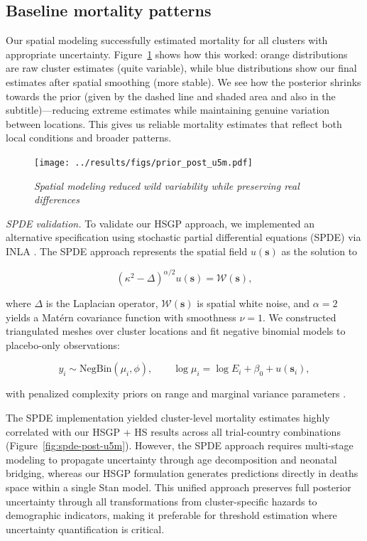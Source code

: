 \documentclass[11pt]{article}\usepackage[]{graphicx}\usepackage[]{xcolor}
\begin{document}
\subsection{Baseline mortality patterns}

Our spatial modeling successfully estimated mortality for all clusters with appropriate uncertainty. Figure~\ref{fig:prior-post-u5m} shows how this worked: orange distributions are raw cluster estimates (quite variable), while blue distributions show our final estimates after spatial smoothing (more stable). We see how the posterior shrinks towards the prior (given by the dashed line and shaded area and also in the subtitle)---reducing extreme estimates while maintaining genuine variation between locations. This gives us reliable mortality estimates that reflect both local conditions and broader patterns. 

\begin{figure}[!h]
\centering
\texttt{[image: ../results/figs/prior\_post\_u5m.pdf]}
\caption{\emph{Spatial modeling reduced wild variability while preserving real differences}}
\label{fig:prior-post-u5m}
\end{figure}

\emph{SPDE validation.} To validate our HSGP approach, we implemented an alternative specification using stochastic partial differential equations (SPDE) via INLA \citep{lindgren2011explicit, lindgren2015bayesian}. The SPDE approach represents the spatial field $u(\mathbf{s})$ as the solution to

\[
(\kappa^2 - \Delta)^{\alpha/2} u(\mathbf{s}) = \mathcal{W}(\mathbf{s}),
\]

where $\Delta$ is the Laplacian operator, $\mathcal{W}(\mathbf{s})$ is spatial white noise, and $\alpha = 2$ yields a Matérn covariance function with smoothness $\nu = 1$. We constructed triangulated meshes over cluster locations and fit negative binomial models to placebo-only observations:

\[
y_i \sim \mathrm{NegBin}(\mu_i, \phi), \qquad \log \mu_i = \log E_i + \beta_0 + u(\mathbf{s}_i),
\]

with penalized complexity priors on range and marginal variance parameters \citep{fuglstad2019pcgrf}.

The SPDE implementation yielded cluster-level mortality estimates highly correlated with our HSGP + HS results across all trial-country combinations (Figure~\ref{fig:spde-post-u5m}). However, the SPDE approach requires multi-stage modeling to propagate uncertainty through age decomposition and neonatal bridging, whereas our HSGP formulation generates predictions directly in deaths space within a single Stan model. This unified approach preserves full posterior uncertainty through all transformations from cluster-specific hazards to demographic indicators, making it preferable for threshold estimation where uncertainty quantification is critical.
\end{document}
